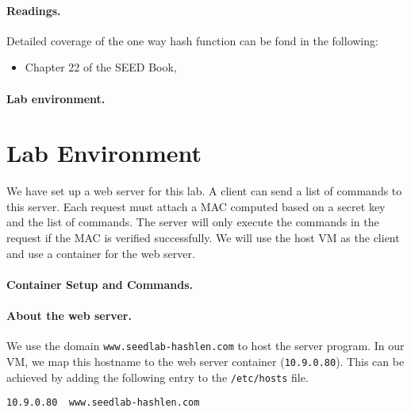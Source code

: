\paragraph{Readings.} Detailed coverage of the one way hash function can be 
fond in the following: 

\begin{itemize}
\item Chapter 22 of the SEED Book, \seedbook
\end{itemize}


\paragraph{Lab environment.} 
\seedenvironmentB
\nodependency




\section{Lab Environment}

We have set up a web server for this lab. 
A client can send a list of commands to this server. 
Each request must attach a MAC computed based on a secret
key and the list of commands. The server will 
only execute the commands in the request if 
the MAC is verified successfully. 
We will use the host VM as the client and use 
a container for the web server.


\paragraph{Container Setup and Commands.}




\paragraph{About the web server.}
We use the domain \texttt{www.seedlab-hashlen.com} to host the server program. 
In our VM, we map this hostname to 
the web server container (\texttt{10.9.0.80}). This can be
achieved by adding the following entry to the 
\texttt{/etc/hosts} file.

\begin{lstlisting}
10.9.0.80  www.seedlab-hashlen.com
\end{lstlisting}



